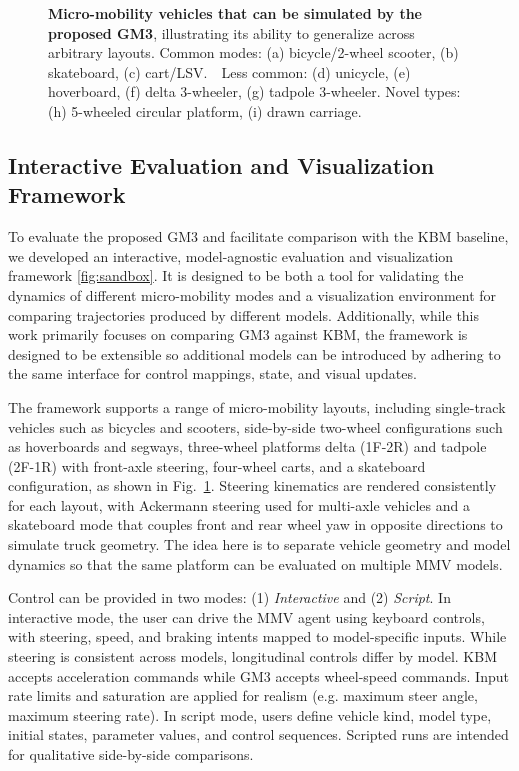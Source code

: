 \documentclass[letterpaper, 10 pt, conference]{ieeeconf}  %
\begin{document}
\begin{figure}
    \caption{\textbf{Micro-mobility vehicles that can be simulated by the proposed GM3}, illustrating its ability to generalize across arbitrary layouts. Common modes: (a) bicycle/2-wheel scooter, (b) skateboard, (c) cart/LSV.~~Less common: (d) unicycle, (e) hoverboard, (f) delta 3-wheeler, (g) tadpole 3-wheeler. Novel types: (h) 5-wheeled circular platform, (i) drawn carriage.}
    \label{fig:platformDiversity}
    \vspace*{-1em}
\end{figure}

\subsection{Interactive Evaluation and Visualization Framework}
To evaluate the proposed GM3 and facilitate comparison with the KBM baseline, we developed an interactive, model-agnostic evaluation and visualization framework \ref{fig:sandbox}. It is designed to be both a tool for validating the dynamics of different micro-mobility modes and a visualization environment for comparing trajectories produced by different models. Additionally, while this work primarily focuses on comparing GM3 against KBM, the framework is designed to be extensible so additional models can be introduced by adhering to the same interface for control mappings, state, and visual updates.

The framework supports a range of micro-mobility layouts, including single-track vehicles such as bicycles and scooters, side-by-side two-wheel configurations such as hoverboards and segways, three-wheel platforms delta (1F-2R) and tadpole (2F-1R) with front-axle steering, four-wheel carts, and a skateboard configuration, as shown in Fig.~\ref{fig:platformDiversity}.
Steering kinematics are rendered consistently for each layout, with Ackermann steering used for multi-axle vehicles and a skateboard mode that couples front and rear wheel yaw in opposite directions to simulate truck geometry. The idea here is to separate vehicle geometry and model dynamics so that the same platform can be evaluated on multiple MMV models.

Control can be provided in two modes: (1) {\em Interactive} and (2) {\em Script}. In interactive mode, the user can drive the MMV agent using keyboard controls, with steering, speed, and braking intents mapped to model-specific inputs. While steering is consistent across models, longitudinal controls differ by model. KBM accepts acceleration commands while GM3 accepts wheel-speed commands. Input rate limits and saturation are applied for realism (e.g. maximum steer angle, maximum steering rate). In script mode, users define vehicle kind, model type, initial states, parameter values, and control sequences. Scripted runs are intended for qualitative side-by-side comparisons.
\end{document}
